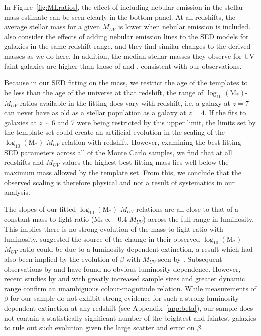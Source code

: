 In Figure~\ref{fig:MLratios}, the effect of including nebular emission in the stellar mass estimate can be seen clearly in the bottom panel. At all redshifts, the average stellar mass for a given $M_{UV}$ is lower when nebular emission is included. \citet{Salmon:2014tm} also consider the effects of adding nebular emission lines to the SED models for galaxies in the same redshift range, and they find similar changes to the derived masses as we do here. In addition, the median stellar masses they observe for UV faint galaxies are higher than those of \citet{Gonzalez:2011dn} and \citet{2012ApJ...752...66L}, consistent with our observations.

Because in our SED fitting on the mass, we restrict the age of the templates to be less than the age of the universe at that redshift, the range of $\log_{10} (\text{M}_{*})$-$M_{UV}$ ratios available in the fitting does vary with redshift, i.e. a galaxy at $z = 7$ can never have as old as a stellar population as a galaxy at $z = 4$. If the fits to galaxies at $z \sim 6$ and 7 were being restricted by this upper limit, the limits set by the template set could create an artificial evolution in the scaling of the $\log_{10} (\text{M}_{*})$-$M_{UV}$ relation with redshift. However, examining the best-fitting SED parameters across all of the Monte Carlo samples, we find that at all redshifts and $M_{UV}$ values the highest best-fitting mass lies well below the maximum mass allowed by the template set. From this, we conclude that the observed scaling is therefore physical and not a result of systematics in our analysis. 

The slopes of our fitted $\log_{10} (\text{M}_{*})$-$M_{UV}$ relations are all close to that of a constant mass to light ratio (M$_{*} \propto -0.4$ $M_{UV}$) across the full range in luminosity. This implies there is no strong evolution of the mass to light ratio with luminosity. \citet{2012ApJ...752...66L} suggested the source of the change in their observed $\log_{10} (\text{M}_{*})$-$M_{UV}$ ratio could be due to a luminosity dependent extinction, a result which had also been implied by the evolution of $\beta$ with $M_{UV}$ seen by \citet{2012ApJ...754...83B}. Subsequent observations by \citet{Dunlop:2011jl} and \citet{2012ApJ...756..164F} have found no obvious luminosity dependence. However, recent studies by \citet{Bouwens:2013vf} and \citep{Rogers:2014bn} with greatly increased sample sizes and greater dynamic range confirm an unambiguous colour-magnitude relation. While measurements of $\beta$ for our sample do not exhibit strong evidence for such a strong luminosity dependent extinction at any redshift (see Appendix~\ref{app:beta}), our sample does not contain a statistically significant number of the brightest and faintest galaxies to rule out such evolution given the large scatter and error on $\beta$. 

